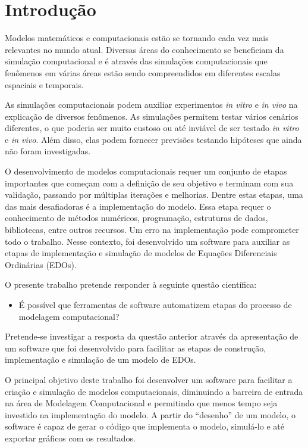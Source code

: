 \documentclass[
	12pt,				%
	openright,			%
	oneside,			%
	a4paper,			%
	main=brazil,
	english,			%
	]{ufsj-abntex2}
\begin{document}
\chapter{Introdução}

Modelos matemáticos e computacionais estão se tornando cada vez mais relevantes no mundo atual. Diversas áreas do conhecimento se beneficiam da simulação computacional e é através das simulações computacionais que fenômenos em várias áreas estão sendo compreendidos em diferentes escalas espaciais e temporais. %

As simulações computacionais podem auxiliar experimentos \textit{in vitro} e \textit{in vivo} na explicação de diversos fenômenos. As simulações permitem testar vários cenários diferentes, o que poderia ser muito custoso ou até inviável de ser testado \textit{in vitro} e \textit{in vivo}. Além disso, elas podem fornecer previsões testando hipóteses que ainda não foram investigadas. %

O desenvolvimento de modelos computacionais requer um conjunto de etapas importantes que começam com a definição de seu objetivo e terminam com sua validação, passando por múltiplas iterações e melhorias. Dentre estas etapas, uma das mais desafiadoras é a implementação do modelo. Essa etapa requer o conhecimento de métodos numéricos, programação, estruturas de dados, bibliotecas, entre outros recursos. Um erro na implementação pode comprometer todo o trabalho. Nesse contexto, foi desenvolvido um software para auxiliar as etapas de implementação e simulação de modelos de 
Equações Diferenciais Ordinárias (EDOs).

O presente trabalho pretende responder à seguinte questão científica: 
\begin{itemize}
    \item É possível que ferramentas de software automatizem etapas do processo de modelagem computacional?  
\end{itemize}

Pretende-se investigar a resposta da questão anterior através da apresentação de um software que foi desenvolvido para facilitar as etapas de construção, implementação e simulação de um modelo de EDOs. 

O principal objetivo deste trabalho foi desenvolver um software para facilitar a criação e simulação de modelos computacionais, diminuindo a barreira de entrada na área de Modelagem Computacional e permitindo que menos tempo seja investido na implementação do modelo. A partir do ``desenho'' de um modelo, o software é capaz de gerar o código que implementa o modelo, simulá-lo e até exportar gráficos com os resultados.
\end{document}
